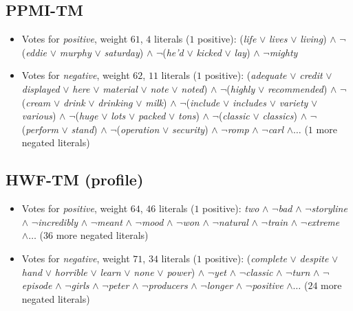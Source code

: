 \subsection{PPMI-TM}
\begin{itemize}
  \item Votes for \emph{positive}, weight $61$, $4$ literals ($1$ positive): (\textit{life} $\lor$ \textit{lives} $\lor$ \textit{living}) $\land$ $\lnot$(\textit{eddie} $\lor$ \textit{murphy} $\lor$ \textit{saturday}) $\land$ $\lnot$(\textit{he'd} $\lor$ \textit{kicked} $\lor$ \textit{lay}) $\land$ $\lnot$\textit{mighty}
  \item Votes for \emph{negative}, weight $62$, $11$ literals ($1$ positive): (\textit{adequate} $\lor$ \textit{credit} $\lor$ \textit{displayed} $\lor$ \textit{here} $\lor$ \textit{material} $\lor$ \textit{note} $\lor$ \textit{noted}) $\land$ $\lnot$(\textit{highly} $\lor$ \textit{recommended}) $\land$ $\lnot$(\textit{cream} $\lor$ \textit{drink} $\lor$ \textit{drinking} $\lor$ \textit{milk}) $\land$ $\lnot$(\textit{include} $\lor$ \textit{includes} $\lor$ \textit{variety} $\lor$ \textit{various}) $\land$ $\lnot$(\textit{huge} $\lor$ \textit{lots} $\lor$ \textit{packed} $\lor$ \textit{tons}) $\land$ $\lnot$(\textit{classic} $\lor$ \textit{classics}) $\land$ $\lnot$(\textit{perform} $\lor$ \textit{stand}) $\land$ $\lnot$(\textit{operation} $\lor$ \textit{security}) $\land$ $\lnot$\textit{romp} $\land$ $\lnot$\textit{carl} $\land \dots$ ($1$ more negated literals)
\end{itemize}

\subsection{HWF-TM (profile)}
\begin{itemize}
  \item Votes for \emph{positive}, weight $64$, $46$ literals ($1$ positive): \textit{two} $\land$ $\lnot$\textit{bad} $\land$ $\lnot$\textit{storyline} $\land$ $\lnot$\textit{incredibly} $\land$ $\lnot$\textit{meant} $\land$ $\lnot$\textit{mood} $\land$ $\lnot$\textit{won} $\land$ $\lnot$\textit{natural} $\land$ $\lnot$\textit{train} $\land$ $\lnot$\textit{extreme} $\land \dots$ ($36$ more negated literals)
  \item Votes for \emph{negative}, weight $71$, $34$ literals ($1$ positive): (\textit{complete} $\lor$ \textit{despite} $\lor$ \textit{hand} $\lor$ \textit{horrible} $\lor$ \textit{learn} $\lor$ \textit{none} $\lor$ \textit{power}) $\land$ $\lnot$\textit{yet} $\land$ $\lnot$\textit{classic} $\land$ $\lnot$\textit{turn} $\land$ $\lnot$\textit{episode} $\land$ $\lnot$\textit{girls} $\land$ $\lnot$\textit{peter} $\land$ $\lnot$\textit{producers} $\land$ $\lnot$\textit{longer} $\land$ $\lnot$\textit{positive} $\land \dots$ ($24$ more negated literals)
\end{itemize}
